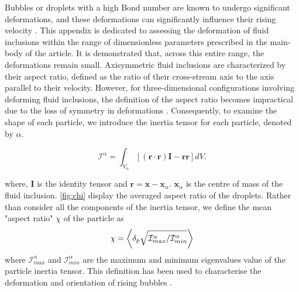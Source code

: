 \documentclass[12pt]{My_preprint}
\begin{document}
Bubbles or droplets with a high Bond number are known to undergo significant deformations, and these deformations can significantly influence their rising velocity \citep{bunner2003effect,tripathi2014}. This appendix is dedicated to assessing the deformation of fluid inclusions within the range of dimensionless parameters prescribed in the main-body of the article. It is demonstrated that, across this entire range, the deformations remain small. Axisymmetric fluid inclusions are characterized by their aspect ratio, defined as the ratio of their cross-stream axis to the axis parallel to their velocity. However, for three-dimensional configurations involving deforming fluid inclusions, the definition of the aspect ratio becomes impractical due to the loss of symmetry in deformations \citep{bunner2003effect}. Consequently, to examine the shape of each particle, we introduce the inertia tensor for each particle, denoted by $\alpha$.




\begin{equation*}
    \mathcal{I}^\alpha
    = \int_{V_\alpha} \left[
        (\textbf{r}\cdot \textbf{r}) \textbf{I}  - \textbf{rr}
        \right]
    dV.
\end{equation*}

where, \textbf{I} is the identity tensor and $\textbf{r} = \textbf{x} - \textbf{x}_\alpha$. $\textbf{x}_\alpha$ is the centre of mass of the fluid inclusion. \ref{fig:chi} display the averaged aspect ratio of the droplets. Rather than consider all the components of the inertia tensor, we define the mean "aspect ratio" $\chi$ of the particle as 
\begin{equation}
    \chi = \left<\delta_p \sqrt{\mathcal{I}_{max}^\alpha /\mathcal{I}_{min}^\alpha} \right>
\end{equation} 
where $\mathcal{I}_{max}^\alpha$ and $\mathcal{I}_{min}^\alpha$ are the maximum and minimum eigenvalues value of the particle inertia tensor. This definition has been used to characterise the deformation and orientation of rising bubbles \citep{bunner2003effect}. 
\end{document}
